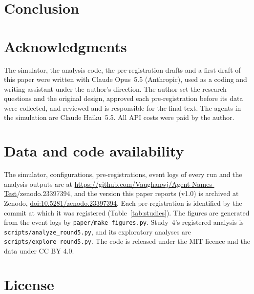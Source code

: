 \documentclass[11pt]{article}
\newcommand{\SOFTWAREDOI}{10.5281/zenodo.23397394}
\begin{document}
\section{Conclusion}



\section*{Acknowledgments}

The simulator, the analysis code, the pre-registration drafts and a first draft of this paper
were written with Claude Opus~5.5 (Anthropic), used as a coding and writing assistant under the
author's direction. The author set the research questions and the original design, approved each
pre-registration before its data were collected, and reviewed and is responsible for the final
text. The agents in the simulation are Claude Haiku~5.5. All API costs were paid by the author.

\section*{Data and code availability}

The simulator, configurations, pre-registrations, event logs of every run and the analysis
outputs are at \url{https://github.com/Vaughanwj/Agent-Names-Test}\ifx\SOFTWAREDOI\empty\else, and
the version this paper reports (v1.0) is archived at Zenodo,
\href{https://doi.org/\SOFTWAREDOI}{doi:\SOFTWAREDOI}\fi. Each pre-registration is
identified by the commit at which it was registered (Table~\ref{tab:studies}). The figures are
generated from the event logs by \texttt{paper/make\_figures.py}. Study~4's registered analysis
is \texttt{scripts/analyze\_round5.py}, and its exploratory analyses are
\texttt{scripts/explore\_round5.py}. The code is released under the MIT licence and the data under
CC BY 4.0.

\section*{License}

\doclicenseThis



\end{document}
